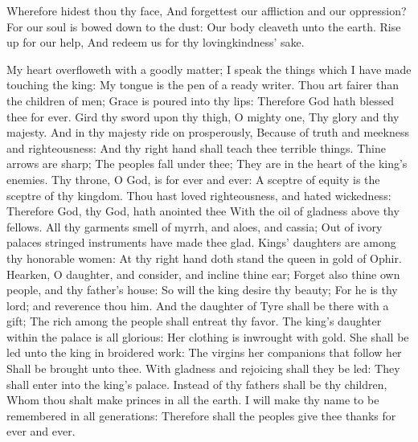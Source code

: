 Wherefore hidest thou thy face, And forgettest our affliction and our oppression?  For our soul is bowed down to the dust: Our body cleaveth unto the earth.  Rise up for our help, And redeem us for thy lovingkindness’ sake. 

My heart overfloweth with a goodly matter; I speak the things which I have made touching the king: My tongue is the pen of a ready writer.  Thou art fairer than the children of men; Grace is poured into thy lips: Therefore God hath blessed thee for ever.  Gird thy sword upon thy thigh, O mighty one, Thy glory and thy majesty.  And in thy majesty ride on prosperously, Because of truth and meekness and righteousness: And thy right hand shall teach thee terrible things.  Thine arrows are sharp; The peoples fall under thee; They are in the heart of the king’s enemies.  Thy throne, O God, is for ever and ever: A sceptre of equity is the sceptre of thy kingdom.  Thou hast loved righteousness, and hated wickedness: Therefore God, thy God, hath anointed thee With the oil of gladness above thy fellows.  All thy garments smell of myrrh, and aloes, and cassia; Out of ivory palaces stringed instruments have made thee glad.  Kings’ daughters are among thy honorable women: At thy right hand doth stand the queen in gold of Ophir.  Hearken, O daughter, and consider, and incline thine ear; Forget also thine own people, and thy father’s house:  So will the king desire thy beauty; For he is thy lord; and reverence thou him.  And the daughter of Tyre shall be there with a gift; The rich among the people shall entreat thy favor.  The king’s daughter within the palace is all glorious: Her clothing is inwrought with gold.  She shall be led unto the king in broidered work: The virgins her companions that follow her Shall be brought unto thee.  With gladness and rejoicing shall they be led: They shall enter into the king’s palace.  Instead of thy fathers shall be thy children, Whom thou shalt make princes in all the earth.  I will make thy name to be remembered in all generations: Therefore shall the peoples give thee thanks for ever and ever. 

